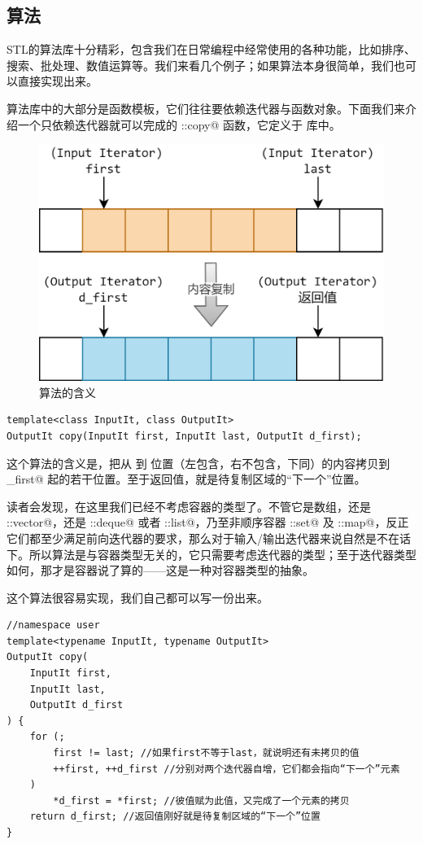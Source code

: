 \subsection*{算法}
STL的算法库十分精彩，包含我们在日常编程中经常使用的各种功能，比如排序、搜索、批处理、数值运算等。我们来看几个例子；如果算法本身很简单，我们也可以直接实现出来。\par
算法库中的大部分是函数模板，它们往往要依赖迭代器与函数对象。下面我们来介绍一个只依赖迭代器就可以完成的 \lstinline@std::copy@ 函数，它定义于 \lstinline@algorithm@ 库中。
\begin{figure}[htbp]
    \centering
    \includegraphics[width=.6\textwidth]{../images/generalized_parts/11_algorithm_copy.drawio.png}
    \caption{\lstinline@copy@ 算法的含义}
\end{figure}
\begin{lstlisting}
template<class InputIt, class OutputIt>
OutputIt copy(InputIt first, InputIt last, OutputIt d_first);
\end{lstlisting}
这个算法的含义是，把从 \lstinline@first@ 到 \lstinline@last@ 位置（左包含，右不包含，下同）的内容拷贝到 \lstinline@d_first@ 起的若干位置。至于返回值，就是待复制区域的``下一个''位置。\par
读者会发现，在这里我们已经不考虑容器的类型了。不管它是数组，还是 \lstinline@std::vector@，还是 \lstinline@std::deque@ 或者 \lstinline@std::list@，乃至非顺序容器 \lstinline@std::set@ 及 \lstinline@std::map@，反正它们都至少满足前向迭代器的要求，那么对于输入/输出迭代器来说自然是不在话下。所以算法是与容器类型无关的，它只需要考虑迭代器的类型；至于迭代器类型如何，那才是容器说了算的——这是一种对容器类型的抽象。\par
这个算法很容易实现，我们自己都可以写一份出来。
\begin{lstlisting}
//namespace user
template<typename InputIt, typename OutputIt>
OutputIt copy(
    InputIt first,
    InputIt last,
    OutputIt d_first
) {
    for (; 
        first != last; //如果first不等于last，就说明还有未拷贝的值
        ++first, ++d_first //分别对两个迭代器自增，它们都会指向“下一个”元素
    )
        *d_first = *first; //彼值赋为此值，又完成了一个元素的拷贝
    return d_first; //返回值刚好就是待复制区域的“下一个”位置
}
\end{lstlisting}
